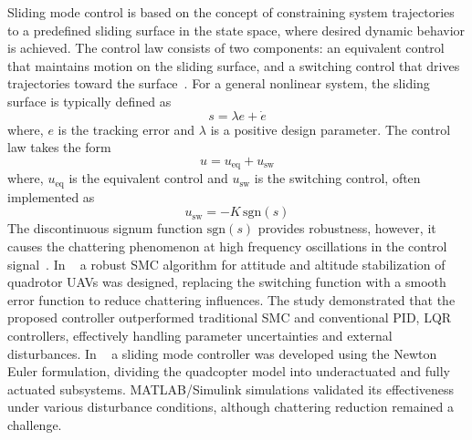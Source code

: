 Sliding mode control is based on the concept of constraining system trajectories to a predefined sliding surface in the state space, where desired dynamic behavior is achieved. The control law consists of two components: an equivalent control that maintains motion on the sliding surface, and a switching control that drives trajectories toward the surface~\cite{anderson2020constrained,mofid2020adaptive}. For a general nonlinear system, the sliding surface is typically defined as
\begin{equation}
s = \lambda e + \dot{e}
\end{equation}
where,  $e$ is the tracking error and $\lambda$ is a positive design parameter. The control law takes the form
\begin{equation}
u = u_{\mathrm{eq}} + u_{\mathrm{sw}}
\end{equation}
where,  $u_{\mathrm{eq}}$ is the equivalent control and $u_{\mathrm{sw}}$ is the switching control, often implemented as
\begin{equation}
u_{\mathrm{sw}} = -K\,\mathrm{sgn}(s)
\end{equation}
The discontinuous signum function $\mathrm{sgn}(s)$ provides robustness, however, it causes the chattering phenomenon at high frequency oscillations in the control signal~\cite{anderson2020constrained,elagib2023sliding}. In  ~\cite{eltayeb2020sliding} a robust SMC algorithm for attitude and altitude stabilization of quadrotor UAVs was designed, replacing the switching function with a smooth error function to reduce chattering influences. The study demonstrated that the proposed controller outperformed traditional SMC and conventional PID, LQR  controllers, effectively handling parameter uncertainties and external disturbances.  In ~\cite{elagib2023sliding}  a sliding mode controller was developed using the Newton Euler formulation, dividing the quadcopter model into underactuated and fully actuated subsystems. MATLAB/Simulink simulations validated its effectiveness under various disturbance conditions, although chattering reduction remained a challenge.%

